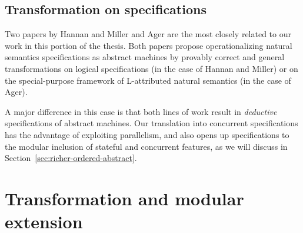 \subsection*{Transformation on specifications}

Two papers by Hannan and Miller \cite{hannan92operational} and Ager
\cite{ager04natural} are the most closely related to our work in this
portion of the thesis. Both papers propose operationalizing natural
semantics specifications as abstract machines by provably correct and
general transformations on logical specifications (in the case of
Hannan and Miller) or on the special-purpose framework of L-attributed
natural semantics (in the case of Ager).

A major difference in this case is that both lines of
work result in {\it deductive} specifications of abstract
machines. Our translation into concurrent specifications has the
advantage of exploiting parallelism, and also opens up specifications to
the modular inclusion of stateful and concurrent features, as we will
discuss in Section~\ref{sec:richer-ordered-abstract}.


\section{Transformation and modular extension}
\label{sec:the-point-is-modular-extension}

